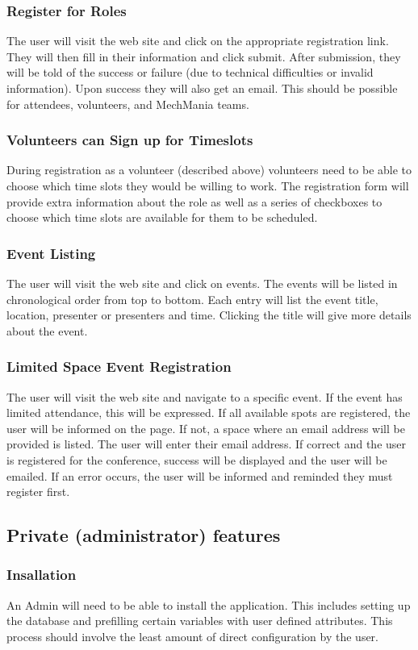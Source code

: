 \documentclass[12pt]{article}
\begin{document}
\subsubsection{Register for Roles}
The user will visit the web site and click on the appropriate registration link.
They will then fill in their information and click submit. After submission,
they will be told of the success or failure (due to technical difficulties or
invalid information). Upon success they will also get an email. This should be
possible for attendees, volunteers, and MechMania teams.
\subsubsection{Volunteers can Sign up for Timeslots}
During registration as a volunteer (described above) volunteers need to be able
to choose which time slots they would be willing to work. The registration form
will provide extra information about the role as well as a series of checkboxes
to choose which time slots are available for them to be scheduled.
\subsubsection{Event Listing}
The user will visit the web site and click on events. The events will be
listed in chronological order from top to bottom. Each entry will list the
event title, location, presenter or presenters and time. Clicking the title
will give more details about the event.
\subsubsection{Limited Space Event Registration}
The user will visit the web site and navigate to a specific event. If the event
has limited attendance, this will be expressed. If all available spots are
registered, the user will be informed on the page. If not, a space where an
email address will be provided is listed. The user will enter their email
address. If correct and the user is registered for the conference, success will
be displayed and the user will be emailed. If an error occurs, the user will be
informed and reminded they must register first.

\subsection{Private (administrator) features}
\subsubsection{Insallation}
An Admin will need to be able to install the application. This includes setting up the database
and prefilling certain variables with user defined attributes. This process should involve the least
amount of direct configuration by the user.
\end{document}
